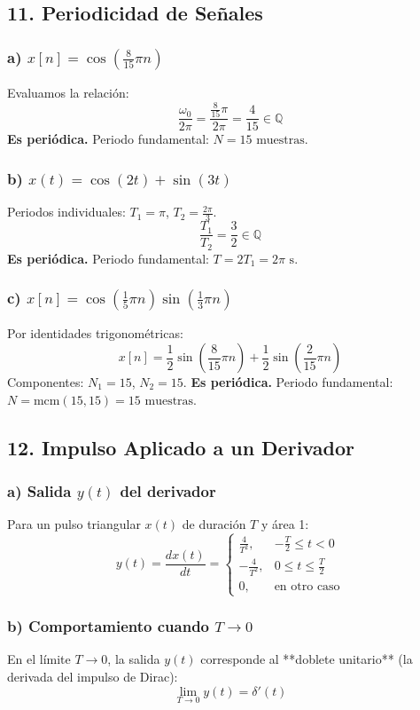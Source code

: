 \documentclass[12pt]{article}
\begin{document}
\subsection*{11. Periodicidad de Señales}

\subsubsection*{a) $x[n] = \cos\left(\frac{8}{15}\pi n\right)$}
Evaluamos la relación:
\[ \frac{\omega_0}{2\pi} = \frac{\frac{8}{15}\pi}{2\pi} = \frac{4}{15} \in \mathbb{Q} \]
\textbf{Es periódica.} Periodo fundamental: $N = 15 \text{ muestras}$.

\subsubsection*{b) $x(t) = \cos(2t) + \sin(3t)$}
Periodos individuales: $T_1 = \pi$, $T_2 = \frac{2\pi}{3}$.
\[ \frac{T_1}{T_2} = \frac{3}{2} \in \mathbb{Q} \]
\textbf{Es periódica.} Periodo fundamental: $T = 2T_1 = 2\pi \text{ s}$.

\subsubsection*{c) $x[n] = \cos\left(\frac{1}{5}\pi n\right)\sin\left(\frac{1}{3}\pi n\right)$}
Por identidades trigonométricas:
\[ x[n] = \frac{1}{2}\sin\left(\frac{8}{15}\pi n\right) + \frac{1}{2}\sin\left(\frac{2}{15}\pi n\right) \]
Componentes: $N_1 = 15$, $N_2 = 15$.
\textbf{Es periódica.} Periodo fundamental: $N = \text{mcm}(15, 15) = 15 \text{ muestras}$.

\subsection*{12. Impulso Aplicado a un Derivador}

\subsubsection*{a) Salida $y(t)$ del derivador}
Para un pulso triangular $x(t)$ de duración $T$ y área 1:
\[ y(t) = \frac{dx(t)}{dt} = \begin{cases} 
\frac{4}{T^2}, & -\frac{T}{2} \le t < 0 \\
-\frac{4}{T^2}, & 0 \le t \le \frac{T}{2} \\
0, & \text{en otro caso}
\end{cases} \]

\subsubsection*{b) Comportamiento cuando $T \to 0$}
En el límite $T \to 0$, la salida $y(t)$ corresponde al **doblete unitario** (la derivada del impulso de Dirac):
\[ \lim_{T \to 0} y(t) = \delta'(t) \]
\end{document}
